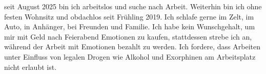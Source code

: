 		seit August 2025 bin ich arbeitslos und suche nach Arbeit.
		Weiterhin bin ich ohne festen Wohnsitz und obdachlos seit Frühling 2019.
		Ich schlafe gerne im Zelt, im Auto, in Anhänger, bei Freunden und Familie.
		Ich habe kein Wunschgehalt, um mir mit Geld nach Feierabend Emotionen zu kaufen, stattdessen strebe ich an, während der Arbeit mit Emotionen bezahlt zu werden.
		Ich fordere, dass Arbeiten unter Einfluss von legalen Drogen wie Alkohol und Exorphinen am Arbeitsplatz nicht erlaubt ist.